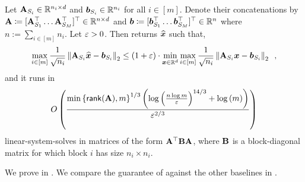\begin{mainthm}\label{mainthm:fair_regression_iteration_complexity}
Let $\mathbf{A}_{S_i} \in \mathbb{R}^{n_i \times d}$ and $\bm{b}_{S_i} \in \mathbb{R}^{n_i}$ for all $i\in[m]$. Denote their concatenations by $\mathbf{A}\coloneqq [\mathbf{A}_{S_1}^{\top} \dots \mathbf{A}_{S_M}^{\top}]^{\top}\in\mathbb{R}^{n\times d}$ and $\vb \coloneqq [\vb_{S_1}^{\top}\dots\vb_{S_M}^{\top}]^{\top}\in \R^n$ where $n:= \sum_{i\in[m]}n_i$. Let $\varepsilon > 0$. Then  returns $\widehat{\bm{x}}$ such that,
\begin{align}
    \max_{i\in[m]} \frac{1}{\sqrt{n_i}}\left\lVert \mathbf{A}_{S_i}\widehat{\bm{x}}-\bm{b}_{S_i} \right\rVert_2 \le (1+\varepsilon)\cdot\min_{\bm{x}\in\mathbb{R}^d}\max_{i\in[m]} \frac{1}{\sqrt{n_i}}\left\lVert \mathbf{A}_{S_i}\bm{x}-\bm{b}_{S_i} \right\rVert_2\enspace,\label{eq:objective_approx}
\end{align}
and it runs in
\begin{align*}
    O\left(\frac{\min\left\{\mathsf{rank}(\mathbf{A}),m\right\}^{1/3}\left(\log\left(\frac{n\log m}{\varepsilon}\right)^{14/3}+\log\left(m\right)\right)}{\varepsilon^{2/3}}\right)
\end{align*}
linear-system-solves in matrices of the form $\mathbf{A}^{\top}\mathbf{B}\mathbf{A}$, where $\mathbf{B}$ is a block-diagonal matrix for which block $i$ has size $n_i \times n_i$.
\end{mainthm}
We prove  in . We compare the guarantee of  against the other baselines in . 

